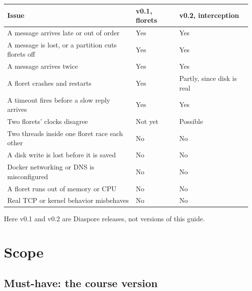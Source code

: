 \documentclass[11pt,letterpaper]{article}
\begin{document}
\begin{center}
\small
\begin{tabularx}{\linewidth}{@{}X l l@{}}
\toprule
\textbf{Issue} & \textbf{v0.1, florets} & \textbf{v0.2, interception} \\
\midrule
A message arrives late or out of order & Yes & Yes \\
A message is lost, or a partition cuts florets off & Yes & Yes \\
A message arrives twice & Yes & Yes \\
A floret crashes and restarts & Yes & Partly, since disk is real \\
A timeout fires before a slow reply arrives & Yes & Yes \\
Two florets' clocks disagree & Not yet & Possible \\
Two threads inside one floret race each other & No & No \\
A disk write is lost before it is saved & No & No \\
Docker networking or DNS is misconfigured & No & No \\
A floret runs out of memory or CPU & No & No \\
Real TCP or kernel behavior misbehaves & No & No \\
\bottomrule
\end{tabularx}
\end{center}

Here v0.1 and v0.2 are Diaspore releases, not versions of this guide.

\section{Scope}

\subsection{Must-have: the course version}
\end{document}
